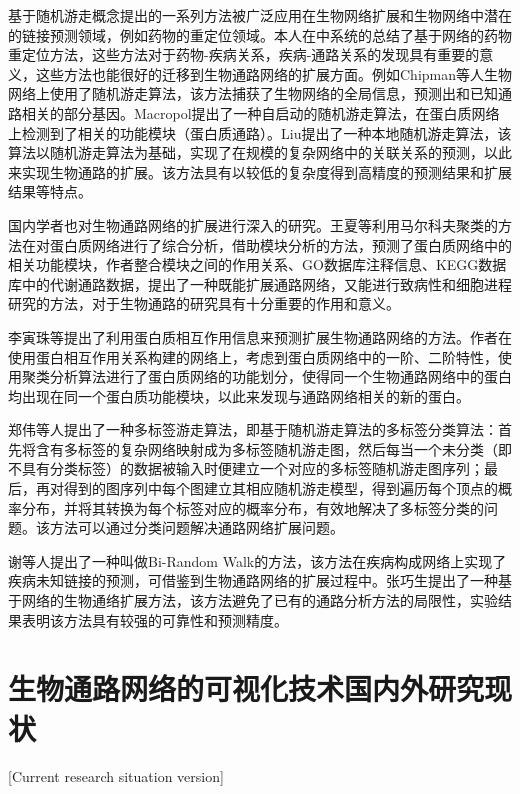 基于随机游走概念提出的一系列方法被广泛应用在生物网络扩展和生物网络中潜在的链接预测领域，例如药物的重定位领域。本人在\cite{xue2018review}中系统的总结了基于网络的药物重定位方法，这些方法对于药物-疾病关系，疾病-通路关系的发现具有重要的意义，这些方法也能很好的迁移到生物通路网络的扩展方面。例如Chipman\cite{chipman2009predicting}等人生物网络上使用了随机游走算法，该方法捕获了生物网络的全局信息，预测出和已知通路相关的部分基因。Macropol\cite{macropol2009rrw}提出了一种自启动的随机游走算法，在蛋白质网络上检测到了相关的功能模块（蛋白质通路）。Liu\cite{liu2010link}提出了一种本地随机游走算法，该算法以随机游走算法为基础，实现了在规模的复杂网络中的关联关系的预测，以此来实现生物通路的扩展。该方法具有以较低的复杂度得到高精度的预测结果和扩展结果等特点。


国内学者也对生物通路网络的扩展进行深入的研究。王夏\cite{wang2009}等利用马尔科夫聚类的方法在对蛋白质网络进行了综合分析，借助模块分析的方法，预测了蛋白质网络中的相关功能模块，作者整合模块之间的作用关系、GO数据库注释信息、KEGG\cite{kanehisa2008kegg}数据库中的代谢通路数据，提出了一种既能扩展通路网络，又能进行致病性和细胞进程研究的方法，对于生物通路的研究具有十分重要的作用和意义。

李寅珠\cite{liyinzhu2012}等提出了利用蛋白质相互作用信息来预测扩展生物通路网络的方法。作者在使用蛋白相互作用关系构建的网络上，考虑到蛋白质网络中的一阶、二阶特性，使用聚类分析算法进行了蛋白质网络的功能划分，使得同一个生物通路网络中的蛋白均出现在同一个蛋白质功能模块，以此来发现与通路网络相关的新的蛋白。

郑伟\cite{zhengwei2010}等人提出了一种多标签游走算法，即基于随机游走算法的多标签分类算法：首先将含有多标签的复杂网络映射成为多标签随机游走图，然后每当一个未分类（即不具有分类标签）的数据被输入时便建立一个对应的多标签随机游走图序列；最后，再对得到的图序列中每个图建立其相应随机游走模型，得到遍历每个顶点的概率分布，并将其转换为每个标签对应的概率分布，有效地解决了多标签分类的问题。该方法可以通过分类问题解决通路网络扩展问题。

谢\cite{xie2012prioritizing}等人提出了一种叫做Bi-Random Walk的方法，该方法在疾病构成网络上实现了疾病未知链接的预测，可借鉴到生物通路网络的扩展过程中。张巧生\cite{zhang2016network}提出了一种基于网络的生物通络扩展方法，该方法避免了已有的通路分析方法的局限性，实验结果表明该方法具有较强的可靠性和预测精度。

\section{生物通路网络的可视化技术国内外研究现状}[Current research situation version]

